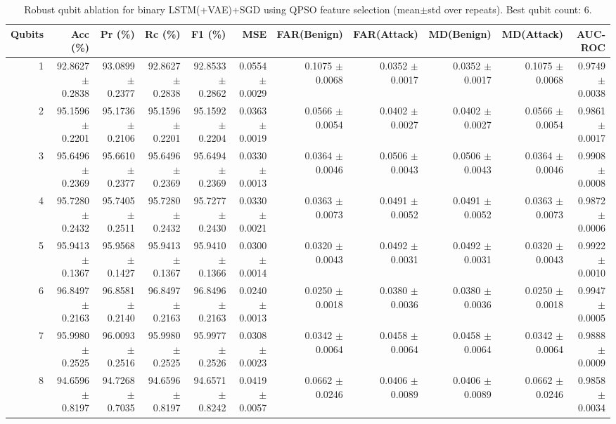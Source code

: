 \begin{table}[t]
\centering
\caption{Robust qubit ablation for binary LSTM(+VAE)+SGD using QPSO feature selection (mean$\pm$std over repeats). Best qubit count: 6.}\n\label{tab:qubit_ablation_improved_robust}
\begin{tabular}{r r r r r r r r r r r}
\hline
Qubits & Acc (\%) & Pr (\%) & Rc (\%) & F1 (\%) & MSE & FAR(Benign) & FAR(Attack) & MD(Benign) & MD(Attack) & AUC-ROC \\ \hline
1 & 92.8627 $\pm$ 0.2838 & 93.0899 $\pm$ 0.2377 & 92.8627 $\pm$ 0.2838 & 92.8533 $\pm$ 0.2862 & 0.0554 $\pm$ 0.0029 & 0.1075 $\pm$ 0.0068 & 0.0352 $\pm$ 0.0017 & 0.0352 $\pm$ 0.0017 & 0.1075 $\pm$ 0.0068 & 0.9749 $\pm$ 0.0038 \\ 
2 & 95.1596 $\pm$ 0.2201 & 95.1736 $\pm$ 0.2106 & 95.1596 $\pm$ 0.2201 & 95.1592 $\pm$ 0.2204 & 0.0363 $\pm$ 0.0019 & 0.0566 $\pm$ 0.0054 & 0.0402 $\pm$ 0.0027 & 0.0402 $\pm$ 0.0027 & 0.0566 $\pm$ 0.0054 & 0.9861 $\pm$ 0.0017 \\ 
3 & 95.6496 $\pm$ 0.2369 & 95.6610 $\pm$ 0.2377 & 95.6496 $\pm$ 0.2369 & 95.6494 $\pm$ 0.2369 & 0.0330 $\pm$ 0.0013 & 0.0364 $\pm$ 0.0046 & 0.0506 $\pm$ 0.0043 & 0.0506 $\pm$ 0.0043 & 0.0364 $\pm$ 0.0046 & 0.9908 $\pm$ 0.0008 \\ 
4 & 95.7280 $\pm$ 0.2432 & 95.7405 $\pm$ 0.2511 & 95.7280 $\pm$ 0.2432 & 95.7277 $\pm$ 0.2430 & 0.0330 $\pm$ 0.0021 & 0.0363 $\pm$ 0.0073 & 0.0491 $\pm$ 0.0052 & 0.0491 $\pm$ 0.0052 & 0.0363 $\pm$ 0.0073 & 0.9872 $\pm$ 0.0006 \\ 
5 & 95.9413 $\pm$ 0.1367 & 95.9568 $\pm$ 0.1427 & 95.9413 $\pm$ 0.1367 & 95.9410 $\pm$ 0.1366 & 0.0300 $\pm$ 0.0014 & 0.0320 $\pm$ 0.0043 & 0.0492 $\pm$ 0.0031 & 0.0492 $\pm$ 0.0031 & 0.0320 $\pm$ 0.0043 & 0.9922 $\pm$ 0.0010 \\ 
6 & 96.8497 $\pm$ 0.2163 & 96.8581 $\pm$ 0.2140 & 96.8497 $\pm$ 0.2163 & 96.8496 $\pm$ 0.2163 & 0.0240 $\pm$ 0.0013 & 0.0250 $\pm$ 0.0018 & 0.0380 $\pm$ 0.0036 & 0.0380 $\pm$ 0.0036 & 0.0250 $\pm$ 0.0018 & 0.9947 $\pm$ 0.0005 \\ 
7 & 95.9980 $\pm$ 0.2525 & 96.0093 $\pm$ 0.2516 & 95.9980 $\pm$ 0.2525 & 95.9977 $\pm$ 0.2526 & 0.0308 $\pm$ 0.0023 & 0.0342 $\pm$ 0.0064 & 0.0458 $\pm$ 0.0064 & 0.0458 $\pm$ 0.0064 & 0.0342 $\pm$ 0.0064 & 0.9888 $\pm$ 0.0009 \\ 
8 & 94.6596 $\pm$ 0.8197 & 94.7268 $\pm$ 0.7035 & 94.6596 $\pm$ 0.8197 & 94.6571 $\pm$ 0.8242 & 0.0419 $\pm$ 0.0057 & 0.0662 $\pm$ 0.0246 & 0.0406 $\pm$ 0.0089 & 0.0406 $\pm$ 0.0089 & 0.0662 $\pm$ 0.0246 & 0.9858 $\pm$ 0.0034 \\ 
\hline
\end{tabular}
\end{table}
